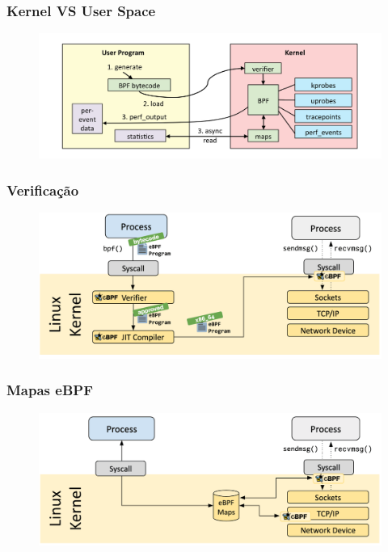 \documentclass[pdflatex,compress]{beamer}
\begin{document}
\begin{frame}
\frametitle{Kernel VS User Space}


\begin{figure}[x]
\includegraphics[scale=0.21]{images/internal.png}
\centering
\end{figure}

\end{frame}

%
%
%


\begin{frame}
\frametitle{Verificação}


\begin{figure}[x]
\includegraphics[scale=0.25]{images/verifier.png}
\centering
\end{figure}

\end{frame}


\begin{frame}
\frametitle{Mapas eBPF}


\begin{figure}[x]
\includegraphics[scale=0.25]{images/map.png}
\centering
\end{figure}

\end{frame}
\end{document}
